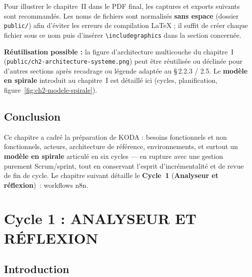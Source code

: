 \documentclass[a4paper,12pt]{report}
\begin{document}
	Pour illustrer le chapitre~II dans le PDF final, les captures et exports suivants
	 sont recommandés. Les noms de fichiers sont normalisés \textbf{sans espace}
	(dossier \texttt{public/}) afin d'éviter les erreurs de compilation \LaTeX{} ; il
	suffit de créer chaque fichier sous ce nom puis d'insérer
	\texttt{\textbackslash includegraphics} dans la section concernée.
	

	
	\noindent\textbf{Réutilisation possible :} la figure d'architecture multicouche du
	chapitre~I (\texttt{public/ch2-architecture-systeme.png}) peut être réutilisée ou
	déclinée pour d'autres sections après recadrage ou légende adaptée au
	§\,2.2.3 / 2.5. Le \textbf{modèle en spirale} introduit au chapitre~I est détaillé
	ici (cycles, planification, figure~\ref{fig:ch2-modele-spirale}).
	
	\section{Conclusion}
	
	Ce chapitre a cadré la préparation de KODA : besoins fonctionnels et non
	fonctionnels, acteurs, architecture de référence, environnements, et surtout un
	\textbf{modèle en spirale} articulé en six cycles — en rupture avec une
	gestion purement Scrum/sprint, tout en conservant l'esprit d'incrémentalité et de
	revue de fin de cycle. Le chapitre suivant détaille le \textbf{Cycle~1} (\textbf{Analyseur et réflexion})~: workflows n8n.
	
	\chapter{Cycle 1 : ANALYSEUR ET RÉFLEXION}
	
	
	\section{Introduction}
	
\end{document}
